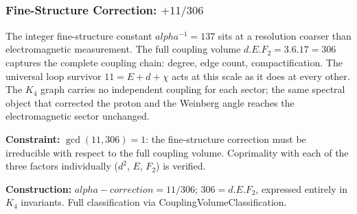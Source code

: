 \documentclass[11pt,a4paper]{book}
\def\alpha{alpha}%
\def\cdot{.}%
\def\texttt#1{#1}%
\begin{document}
\begin{code}
%
\\[\AgdaEmptyExtraSkip]%
\>[0]\AgdaSpace{}%
\AgdaSymbol{:}\AgdaSpace{}%
\AgdaSpace{}%
\AgdaSpace{}%
\AgdaSpace{}%
\AgdaSpace{}%
\<%
\\
\>[0]\AgdaSpace{}%
\AgdaSymbol{=}\AgdaSpace{}%
\<%
\\
%
\\[\AgdaEmptyExtraSkip]%
\>[0]\<%
\\
\>[0]\AgdaSpace{}%
\AgdaSymbol{:}\AgdaSpace{}%
\<%
\\
\>[0]\AgdaSpace{}%
\AgdaSymbol{=}\AgdaSpace{}%
\<%
\end{code}

\subsubsection*{Fine-Structure Correction: $+11/306$}

The integer fine-structure constant $\alpha^{-1} = 137$ sits at a resolution coarser
than electromagnetic measurement.  The full coupling volume $d \cdot E \cdot F_2 =
3 \cdot 6 \cdot 17 = 306$ captures the complete coupling chain: degree, edge count,
compactification.  The universal loop survivor $11 = E + d + \chi$ acts at this scale
as it does at every other.  The $K_4$ graph carries no independent coupling for each
sector; the same spectral object that corrected the proton and the Weinberg angle
reaches the electromagnetic sector unchanged.

\medskip
\noindent
\textbf{Constraint:}
$\gcd(11, 306) = 1$: the fine-structure correction must be irreducible with respect
to the full coupling volume.  Coprimality with each of the three factors individually
($d^2$, $E$, $F_2$) is verified.

\noindent
\textbf{Construction:}
$\texttt{alpha-correction} = 11/306$; $306 = d \cdot E \cdot F_2$, expressed entirely
in $K_4$ invariants.  Full classification via \texttt{CouplingVolumeClassification}.
\end{document}
